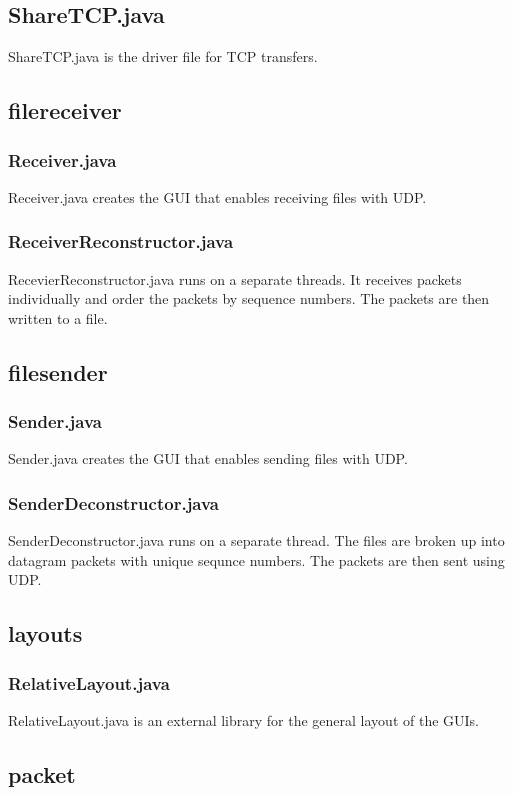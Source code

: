 \documentclass[a4paper,10pt]{article}
\begin{document}
\subsection{ShareTCP.java}
ShareTCP.java is the driver file for TCP transfers.

\subsection{filereceiver}
\subsubsection{Receiver.java}
Receiver.java creates the GUI that enables receiving files with UDP.
\subsubsection{ReceiverReconstructor.java}
RecevierReconstructor.java runs on a separate threads. It receives packets
individually and order the packets by sequence numbers.
The packets are then written to a file.

\subsection{filesender}
\subsubsection{Sender.java}
Sender.java creates the GUI that enables sending files with UDP.
\subsubsection{SenderDeconstructor.java}
SenderDeconstructor.java runs on a separate thread. The files are broken up
into datagram packets with unique sequnce numbers. The packets are then sent
using UDP.

\subsection{layouts}
\subsubsection{RelativeLayout.java}
RelativeLayout.java is an external library for the general layout of the GUIs.

\subsection{packet}
\end{document}
